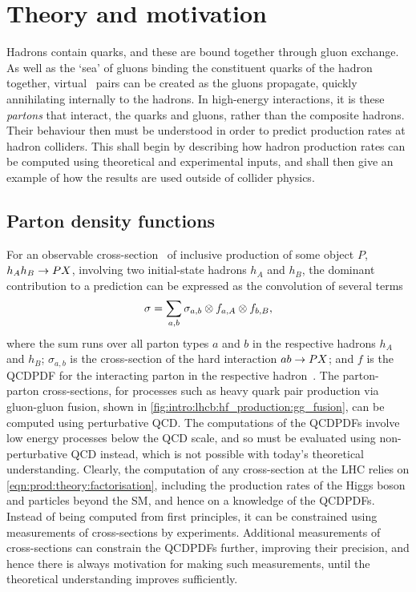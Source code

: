 \chapter{Theory and motivation}
\label{chap:prod:theory}

Hadrons contain quarks, and these are bound together through gluon exchange.
As well as the `sea' of gluons binding the constituent quarks of the hadron 
together, virtual \qqbar\ pairs can be created as the gluons propagate, quickly 
annihilating internally to the hadrons.
In high-energy interactions, it is these \emph{partons} that interact, the 
quarks and gluons, rather than the composite hadrons.
Their behaviour then must be understood in order to predict production rates at 
hadron colliders.
This  shall begin by describing how hadron 
production rates can be computed using theoretical and experimental inputs, and 
shall then give an example of how the results are used outside of collider 
physics.

\section{Parton density functions}
\label{chap:prod:theory:pdfs}

For an observable cross-section \xsec\ of inclusive production of some object 
$P$, $h_{A}h_{B} \to PX$, involving two initial-state hadrons $h_{A}$ and 
$h_{B}$, the dominant contribution to a prediction can be expressed as the 
convolution of several terms
\begin{equation}
  \sigma = \sum_{a,b} \sigma_{a,b} \otimes f_{a,A} \otimes f_{b,B},
  \label{eqn:prod:theory:factorisation}
\end{equation}
where the sum runs over all parton types $a$ and $b$ in the respective hadrons 
$h_{A}$ and $h_{B}$; $\sigma_{a,b}$ is the cross-section of the hard 
interaction $ab \to PX$; and $f$ is the \ac{QCDPDF} for the interacting 
parton in the respective hadron~\cite{Collins:1989gx,Forte:2013wc}.
The parton-parton cross-sections, for processes such as heavy quark pair 
production via gluon-gluon fusion, shown in 
\cref{fig:intro:lhcb:hf_production:gg_fusion}, can be computed using 
perturbative \ac{QCD}.
The computations of the \acp{QCDPDF} involve low energy processes below the 
\ac{QCD} scale, and so must be evaluated using non-perturbative \ac{QCD} 
instead, which is not possible with today's theoretical understanding.
Clearly, the computation of any cross-section at the \ac{LHC} relies on 
\cref{eqn:prod:theory:factorisation}, including the production rates of the 
Higgs boson and particles beyond the \ac{SM}, and hence on a knowledge of the 
\acp{QCDPDF}.
Instead of being computed from first principles, it can be constrained using 
measurements of cross-sections by experiments.
Additional measurements of cross-sections can constrain the \acp{QCDPDF} 
further, improving their precision, and hence there is always motivation for 
making such measurements, until the theoretical understanding improves 
sufficiently.

